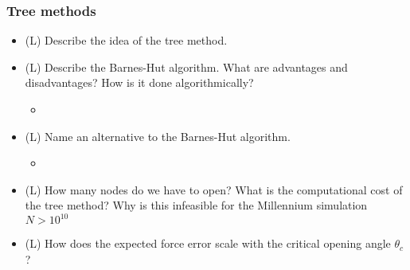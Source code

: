 \subsubsection*{Tree methods}
\begin{itemize}
    \item (L) Describe the idea of the tree method.
    \item (L) Describe the Barnes-Hut algorithm. What are advantages and disadvantages? How is it done algorithmically?
    \begin{itemize}
        \item {}
    \end{itemize}
    \item (L) Name an alternative to the Barnes-Hut algorithm.
    \begin{itemize}
        \item {}
    \end{itemize}
    \item (L) How many nodes do we have to open? What is the computational cost of the tree method? Why is this infeasible for the Millennium simulation $N > 10^{10}$
    \item (L) How does the expected force error scale with the critical opening angle $\theta_c$?
\end{itemize}

